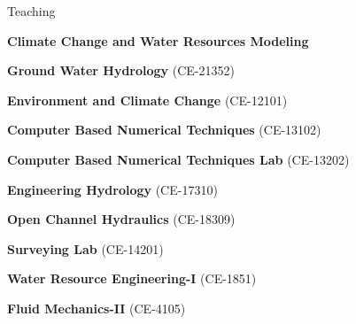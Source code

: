 \begin{rubric}{Teaching}


\entry*{} \textbf{Climate Change and Water Resources Modeling}

\entry*{} \textbf{Ground Water Hydrology} (CE-21352)

\entry*{} \textbf{Environment and Climate Change} (CE-12101)

\entry*{} \textbf{Computer Based Numerical Techniques} (CE-13102)

\entry*{} \textbf{Computer Based Numerical Techniques Lab} (CE-13202)

\entry*{} \textbf{Engineering Hydrology} (CE-17310)

\entry*{} \textbf{Open Channel Hydraulics} (CE-18309)

\entry*{} \textbf{Surveying Lab} (CE-14201)

\entry*{} \textbf{Water Resource Engineering-I} (CE-1851)

\entry*{} \textbf{Fluid Mechanics-II} (CE-4105)

\end{rubric}